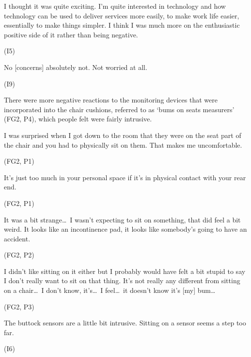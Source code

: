 \begin{qt}I thought it was quite exciting. I’m quite interested in technology
and how technology can be used to deliver services more easily, to
make work life easier, essentially to make things simpler. I think I
was much more on the enthusiastic positive side of it rather than
being negative.\end{qt} (I5)

\begin{qt}No [concerns] absolutely not. Not worried at all.\end{qt} (I9)

There were more negative reactions to the monitoring devices that were
incorporated into the chair cushions, referred to as `bums on seats measurers’ (FG2, P4),
which people felt were fairly intrusive.

\begin{qt}I was surprised when I got down to the room that they were on the
seat part of the chair and you had to physically sit on them. That
makes me uncomfortable.\end{qt} (FG2, P1)

\begin{qt}It’s just too much in your personal space if it’s in
  physical contact with your rear end.\end{qt} (FG2, P1)

\begin{qt}It was a bit strange\ldots\  I wasn’t
expecting to sit on something, that did feel a bit weird. It looks like an incontinence pad, it looks
like somebody’s going to have an accident.\end{qt} (FG2, P2)

\begin{qt}I didn’t like sitting on it either but I probably would have felt a
bit stupid to say I don’t really want to sit on that thing. It’s not
really any different from sitting on a chair\ldots\  I don’t know,
it’s\ldots\  I feel\ldots\  it doesn’t know it’s [my] bum\ldots\end{qt} (FG2, P3)


\begin{qt}The buttock sensors are a little bit intrusive. Sitting on a sensor seems a step too far.\end{qt} (I6)

